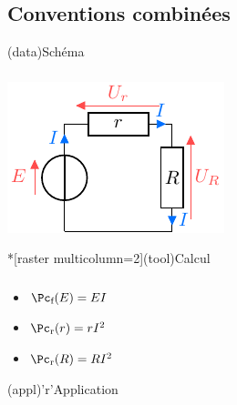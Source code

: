 \documentclass[../../main/main.tex]{subfiles}
\begin{document}
{\subsection{Conventions combinées}
\begin{tcbraster}[raster columns=7, raster equal height=rows]
    \begin{tcb}[raster multicolumn=2](data){Schéma}
        \subsubsection{}
        \vfill
        \begin{center}
            \includegraphics{convs_c}
        \end{center}
        \vfill
    \end{tcb}
    \begin{tcb}*[raster multicolumn=2](tool){Calcul}
        \subsubsection{}
        \vfill
        \begin{itemize}[leftmargin=20pt]
            \item $\Pc_{\text{f}}(E) = EI$
            \item $\Pc_{\text{r}}(r) = rI^2$
            \item $\Pc_{\text{r}}(R) = RI^2$
        \end{itemize}
        \vfill
    \end{tcb}
    \begin{tcb}[raster multicolumn=3](appl)'r'{Application}

\end{tcb}
\end{tcbraster}}
\end{document}
